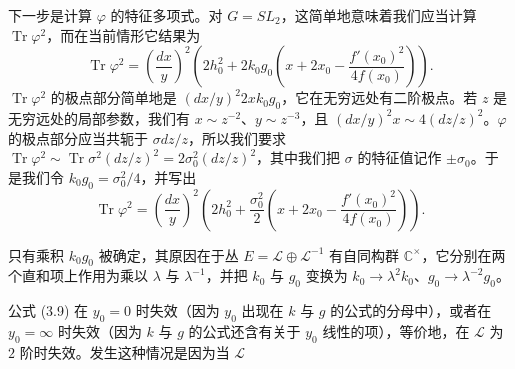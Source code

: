 \documentclass[11pt,a4paper]{article}
\begin{document}
下一步是计算 $\varphi$ 的特征多项式。对 $G=SL_2$，这简单地意味着我们应当计算 $\operatorname{Tr}\varphi^2$，而在当前情形它结果为
\begin{equation}\tag{3.10}
\operatorname{Tr}\varphi^2=\left(\frac{dx}{y}\right)^2\left(2h_0^2+2k_0g_0\left(x+2x_0-\frac{f'(x_0)^2}{4f(x_0)}\right)\right).
\end{equation}
$\operatorname{Tr}\varphi^2$ 的极点部分简单地是 $(dx/y)^2 2xk_0g_0$，它在无穷远处有二阶极点。若 $z$ 是无穷远处的局部参数，我们有 $x\sim z^{-2}$、$y\sim z^{-3}$，且 $(dx/y)^2x\sim 4(dz/z)^2$。$\varphi$ 的极点部分应当共轭于 $\sigma dz/z$，所以我们要求 $\operatorname{Tr}\varphi^2\sim\operatorname{Tr}\sigma^2(dz/z)^2=2\sigma_0^2(dz/z)^2$，其中我们把 $\sigma$ 的特征值记作 $\pm\sigma_0$。于是我们令 $k_0g_0=\sigma_0^2/4$，并写出
\begin{equation}\tag{3.11}
\operatorname{Tr}\varphi^2=\left(\frac{dx}{y}\right)^2\left(2h_0^2+\frac{\sigma_0^2}{2}\left(x+2x_0-\frac{f'(x_0)^2}{4f(x_0)}\right)\right).
\end{equation}

只有乘积 $k_0g_0$ 被确定，其原因在于丛 $E=\mathcal{L}\oplus\mathcal{L}^{-1}$ 有自同构群 $\mathbb{C}^\times$，它分别在两个直和项上作用为乘以 $\lambda$ 与 $\lambda^{-1}$，并把 $k_0$ 与 $g_0$ 变换为 $k_0\to\lambda^2k_0$、$g_0\to\lambda^{-2}g_0$。

公式 (3.9) 在 $y_0=0$ 时失效（因为 $y_0$ 出现在 $k$ 与 $g$ 的公式的分母中），或者在 $y_0=\infty$ 时失效（因为 $k$ 与 $g$ 的公式还含有关于 $y_0$ 线性的项），等价地，在 $\mathcal{L}$ 为 $2$ 阶时失效。发生这种情况是因为当 $\mathcal{L}$

\end{document}
